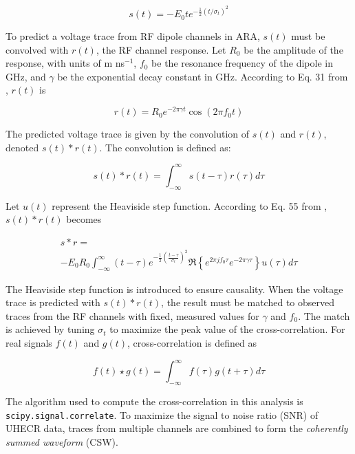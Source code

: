 \documentclass[amsmath,amssymb,aps,prd,10pt,twocolumn,showkeys]{revtex4}
\begin{document}
\begin{equation}
s(t) = -E_0 t e^{-\frac{1}{2}\left(t/\sigma_t\right)^2} \label{eq:s}
\end{equation}

To predict a voltage trace from RF dipole channels in ARA, $s(t)$ must be convolved with $r(t)$, the RF channel response.  Let $R_0$ be the amplitude of the response, with units of m ns$^{-1}$, $f_0$ be the resonance frequency of the dipole in GHz, and $\gamma$ be the exponential decay constant in GHz.  According to Eq. 31 from \cite{hanson2026complex-a31}, $r(t)$ is

\begin{equation}
r(t) = R_0 e^{-2 \pi \gamma t} \cos(2\pi f_0 t) \label{eq:r}
\end{equation}

The predicted voltage trace is given by the convolution of $s(t)$ and $r(t)$, denoted $s(t) * r(t)$.  The convolution is defined as:

\begin{equation}
s(t) * r(t) = \int_{-\infty}^{\infty} s(t-\tau) r(\tau) d\tau 
\end{equation}

Let $u(t)$ represent the Heaviside step function.  According to Eq. 55 from \cite{hanson2026complex-a31}, $s(t) * r(t)$ becomes

\begin{multline}
s * r = \\ -E_0 R_0 \int_{-\infty}^{\infty} (t-\tau) e^{-\frac{1}{2}\left(\frac{t-\tau}{\sigma_t}\right)^2} \Re\left\lbrace e^{2\pi j f_0 \tau} e^{-2\pi\gamma \tau} \right\rbrace u(\tau) d\tau \label{eq:sr}
\end{multline}

The Heaviside step function is introduced to ensure causality.  When the voltage trace is predicted with $s(t) * r(t)$, the result must be matched to observed traces from the RF channels with fixed, measured values for $\gamma$ and $f_0$.  The match is achieved by tuning $\sigma_t$ to maximize the peak value of the cross-correlation.  For real signals $f(t)$ and $g(t)$, cross-correlation is defined as

\begin{equation}
f(t) \star g(t) = \int_{-\infty}^{\infty} f(\tau) g(t+\tau) d\tau
\end{equation}

The algorithm used to compute the cross-correlation in this analysis is \verb+scipy.signal.correlate+.  To maximize the signal to noise ratio (SNR) of UHECR data, traces from multiple channels are combined to form the \textit{coherently summed waveform} (CSW). 
\end{document}

